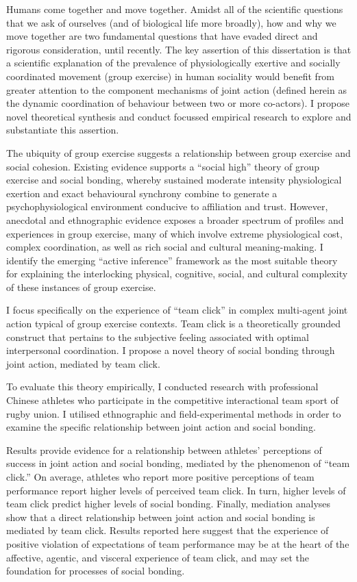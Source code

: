 Humans come together and move together.  Amidst all of the scientific questions that we ask of ourselves (and of biological life more broadly), how and why we move together are two fundamental questions that have evaded direct and rigorous consideration, until recently.  The key assertion of this dissertation is that a scientific explanation of the prevalence of physiologically exertive and socially coordinated movement (group exercise) in human sociality would benefit from greater attention to the component mechanisms of joint action (defined herein as the dynamic coordination of behaviour between two or more co-actors).  I propose novel theoretical synthesis and conduct focussed empirical research to explore and substantiate this assertion.

The ubiquity of group exercise suggests a relationship between group exercise and social cohesion. Existing evidence supports a ``social high'' theory of group exercise and social bonding, whereby sustained moderate intensity physiological exertion and exact behavioural synchrony combine to generate a psychophysiological environment conducive to affiliation and trust.   However, anecdotal and ethnographic evidence exposes a broader spectrum of profiles and experiences in group exercise, many of which involve extreme physiological cost, complex coordination, as well as rich social and cultural meaning-making.   I identify the emerging ``active inference'' framework \citep{Friston2010} as the most suitable theory for explaining the interlocking physical, cognitive, social, and cultural complexity of these instances of group exercise.

I focus specifically on the experience of ``team click'' in complex multi-agent joint action typical of group exercise contexts.  Team click is a theoretically grounded construct that pertains to the subjective feeling associated with optimal interpersonal coordination.  I propose a novel theory of social bonding through joint action, mediated by team click.

To evaluate this theory empirically, I conducted research with professional Chinese athletes who participate in the competitive interactional team sport of rugby union.  I utilised ethnographic and field-experimental methods in order to examine the specific relationship between joint action and social bonding.

Results provide evidence for a relationship between athletes' perceptions of success in joint action and social bonding, mediated by the phenomenon of ``team click.''  On average, athletes who report more positive perceptions of team performance report higher levels of perceived team click.  In turn, higher levels of team click predict higher levels of social bonding. Finally, mediation analyses show that a direct relationship between joint action and social bonding is mediated by team click. Results reported here suggest that the experience of positive violation of expectations of team performance may be at the heart of the affective, agentic, and visceral experience of team click, and may set the foundation for processes of social bonding.

